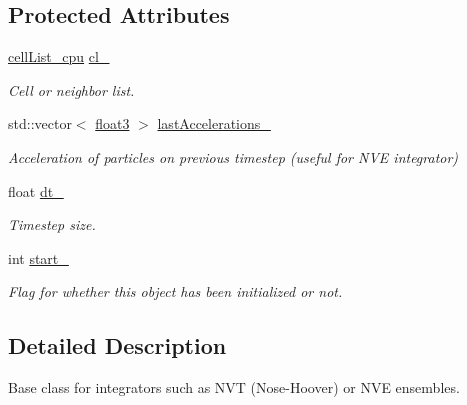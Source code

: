 \subsection*{Protected Attributes}
\begin{DoxyCompactItemize}
\item 
\hypertarget{classintegrator_ad1f7813c9cf3c31898aa7d78fc22232a}{\hyperlink{classcell_list__cpu}{cell\-List\-\_\-cpu} \hyperlink{classintegrator_ad1f7813c9cf3c31898aa7d78fc22232a}{cl\-\_\-}}\label{classintegrator_ad1f7813c9cf3c31898aa7d78fc22232a}

\begin{DoxyCompactList}\small\item\em Cell or neighbor list. \end{DoxyCompactList}\item 
\hypertarget{classintegrator_a3e183a65eb6a777479dca47e7f9a2676}{std\-::vector$<$ \hyperlink{structfloat3}{float3} $>$ \hyperlink{classintegrator_a3e183a65eb6a777479dca47e7f9a2676}{last\-Accelerations\-\_\-}}\label{classintegrator_a3e183a65eb6a777479dca47e7f9a2676}

\begin{DoxyCompactList}\small\item\em Acceleration of particles on previous timestep (useful for N\-V\-E integrator) \end{DoxyCompactList}\item 
\hypertarget{classintegrator_a6e4712b8597e3c40124316d2e9dd5051}{float \hyperlink{classintegrator_a6e4712b8597e3c40124316d2e9dd5051}{dt\-\_\-}}\label{classintegrator_a6e4712b8597e3c40124316d2e9dd5051}

\begin{DoxyCompactList}\small\item\em Timestep size. \end{DoxyCompactList}\item 
\hypertarget{classintegrator_a5b3546a765d8a83b6db8a6d890ace480}{int \hyperlink{classintegrator_a5b3546a765d8a83b6db8a6d890ace480}{start\-\_\-}}\label{classintegrator_a5b3546a765d8a83b6db8a6d890ace480}

\begin{DoxyCompactList}\small\item\em Flag for whether this object has been initialized or not. \end{DoxyCompactList}\end{DoxyCompactItemize}


\subsection{Detailed Description}
Base class for integrators such as N\-V\-T (Nose-\/\-Hoover) or N\-V\-E ensembles. 


